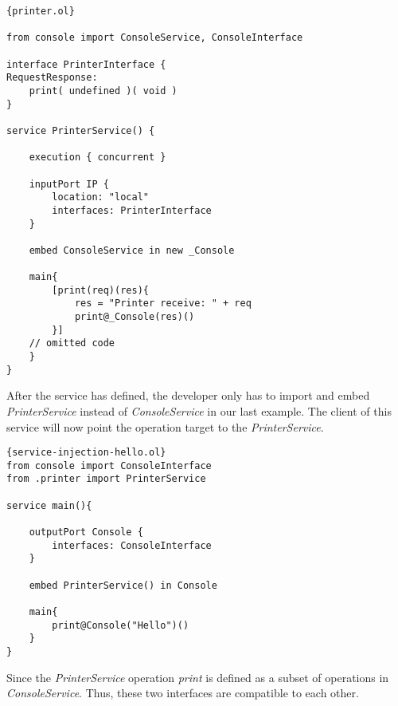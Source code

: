 \begin{listing}[ht]
    \lstset{language=Jolie,
        style=codeStyle,
        numbers=left,
        firstnumber=1
    }
    \begin{lstlisting}[frame=tlrb,
basicstyle=\footnotesize]{printer.ol}

from console import ConsoleService, ConsoleInterface

interface PrinterInterface {
RequestResponse:
    print( undefined )( void )
}

service PrinterService() {

    execution { concurrent }
    
    inputPort IP {
        location: "local"
        interfaces: PrinterInterface
    }

    embed ConsoleService in new _Console

    main{
        [print(req)(res){
            res = "Printer receive: " + req
            print@_Console(res)()
        }]
	// omitted code
    }
}

\end{lstlisting}

\end{listing}

After the service has defined, the developer only has to import and embed \textit{PrinterService} instead of \textit{ConsoleService} in our last example. The client of this service will now point the operation target to the \textit{PrinterService}.

\begin{listing}[ht]
    \lstset{language=Jolie,
        style=codeStyle,
        numbers=left,
        firstnumber=1
    }
    \begin{lstlisting}[frame=tlrb,
basicstyle=\footnotesize]{service-injection-hello.ol}
from console import ConsoleInterface
from .printer import PrinterService

service main(){

    outputPort Console {
        interfaces: ConsoleInterface
    }

    embed PrinterService() in Console

    main{
        print@Console("Hello")()
    }
}
\end{lstlisting}
\end{listing}

Since the \textit{PrinterService} operation \textit{print} is defined as a subset of operations in \textit{ConsoleService}. Thus, these two interfaces are compatible to each other.

